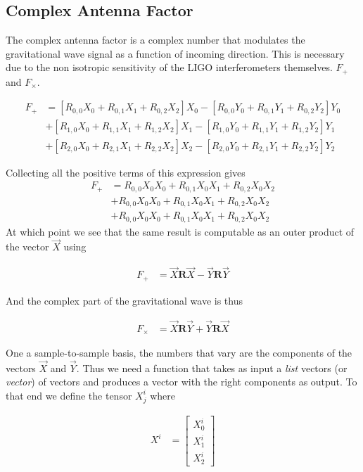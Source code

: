 \documentclass[paper=a4, fontsize=11pt]{scrartcl} %
\numberwithin{equation}{section} %
\numberwithin{figure}{section} %
\numberwithin{table}{section} %
\begin{document}
\subsection{Complex Antenna Factor}
The complex antenna factor is a complex number that modulates the gravitational wave signal as a function of incoming direction. This is necessary due to the non isotropic sensitivity of the LIGO interferometers themselves. $F_{+}$ and $F_{\times}$. 

\begin{align}
F_{+} &= [R_{0,0}X_0 + R_{0,1}X_1 + R_{0,2}X_2]X_0 - [R_{0,0}Y_0 + R_{0,1}Y_1 + R_{0,2}Y_2]Y_0 \\
&+ [R_{1,0}X_0 + R_{1,1}X_1 + R_{1,2}X_2]X_1 - [R_{1,0}Y_0 + R_{1,1}Y_1 + R_{1,2}Y_2]Y_1 \\
&+ [R_{2,0}X_0 + R_{2,1}X_1 + R_{2,2}X_2]X_2 - [R_{2,0}Y_0 + R_{2,1}Y_1 + R_{2,2}Y_2]Y_2
\end{align}

Collecting all the positive terms of this expression gives
\begin{align}
F_{+} &= R_{0,0}X_0X_0 + R_{0,1}X_0X_1 + R_{0,2}X_0X_2 \\
&+ R_{0,0}X_0X_0 + R_{0,1}X_0X_1 + R_{0,2}X_0X_2 \\ 
&+ R_{0,0}X_0X_0 + R_{0,1}X_0X_1 + R_{0,2}X_0X_2 
\end{align}
At which point we see that the same result is computable as an outer product of the vector $\vec{X}$ using

\begin{align}
F_{+} &= \vec{X}\mathbf{R}\vec{X} - \vec{Y}\mathbf{R}\vec{Y}
\end{align}

And the complex part of the gravitational wave is thus

\begin{align}
F_{\times} &= \vec{X}\mathbf{R}\vec{Y} + \vec{Y}\mathbf{R}\vec{X}
\end{align}

One a sample-to-sample basis, the numbers that vary are the components of the vectors $\vec{X}$ and $\vec{Y}$. Thus we need a function that takes as input a \textit{list} vectors (or \textit{vector}) of vectors and produces a vector with the right components as output. To that end we define the tensor $X^{i}_{j}$ where

\begin{align}
X^i &= 
\begin{bmatrix}
X^{i}_0 \\
X^{i}_1 \\
X^{i}_2
\end{bmatrix}
\end{align}
\end{document}

